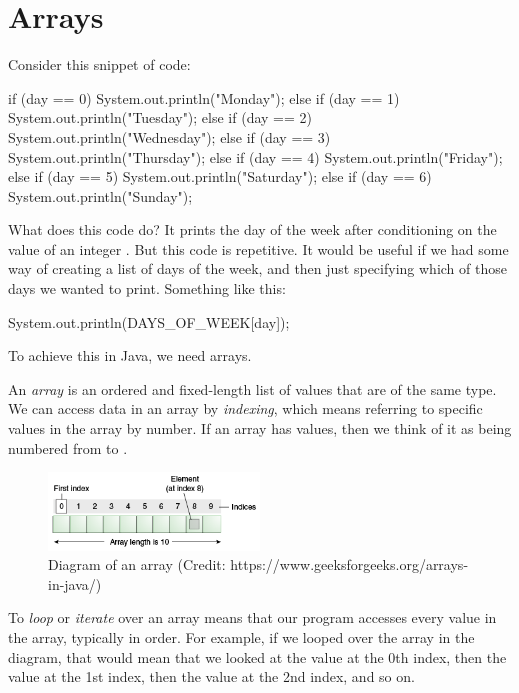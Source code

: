 \chapter{Arrays}

Consider this snippet of code:

\begin{code}
if      (day ==  0) System.out.println("Monday");
else if (day ==  1) System.out.println("Tuesday");
else if (day ==  2) System.out.println("Wednesday");
else if (day ==  3) System.out.println("Thursday");
else if (day ==  4) System.out.println("Friday");
else if (day ==  5) System.out.println("Saturday");
else if (day ==  6) System.out.println("Sunday");
\end{code}

\noindent What does this code do? It prints the day of the week after conditioning on the value of an integer . But this code is repetitive. It would be useful if we had some way of creating a list of days of the week, and then just specifying which of those days we wanted to print. Something like this:

\begin{code}
System.out.println(DAYS\_OF\_WEEK[day]);
\end{code}

To achieve this in Java, we need arrays.

\begin{definition}
An \emph{array} is an ordered and fixed-length list of values that are of the same type. We can access data in an array by \emph{indexing}, which means referring to specific values in the array by number. If an array has  values, then we think of it as being numbered from  to .
\end{definition}

\begin{figure}
	\centering
	\includegraphics[width=0.5\textwidth]{images/array-diagram.png}
	\caption{Diagram of an array (Credit: https://www.geeksforgeeks.org/arrays-in-java/)}
\end{figure}

To \emph{loop} or \emph{iterate} over an array means that our program accesses every value in the array, typically in order. For example, if we looped over the array in the diagram, that would mean that we looked at the value at the 0th index, then the value at the 1st index, then the value at the 2nd index, and so on.

